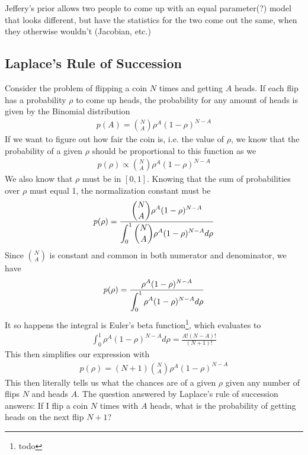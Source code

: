 Jeffery's prior allows two people to come up with an equal parameter(?) model that looks different, but have the statistics for the two come out the same, when they otherwise wouldn't (Jacobian, etc.)

\subsection{Laplace's Rule of Succession}
Consider the problem of flipping a coin $N$ times and getting $A$ heads. If each flip has a probability $\rho$ to come up heads, the probability for any amount of heads is given by the Binomial distribution
\begin{align}
p(A) = {N\choose A}\rho^A(1-\rho)^{N-A}
\end{align}
If we want to figure out how fair the coin is, i.e. the value of $\rho$, we know that the probability of a given $\rho$ should be proportional to this function as we
\begin{align}
	p(\rho) \propto {N\choose A}\rho^A(1-\rho)^{N-A}
\end{align}
We also know that $\rho$ must be in $[0,1]$. Knowing that the sum of probabilities over $\rho$ must equal 1, the normalization constant must be
\begin{align}
	p(\rho) =\frac{\displaystyle  {N\choose A}\rho^A(1-\rho)^{N-A}}{\displaystyle \int_0^1{N\choose A}\rho^A(1-\rho)^{N-A} d\rho}
\end{align}
Since ${N\choose A}$ is constant and common in both numerator and denominator, we have
\begin{align}
	p(\rho) =\frac{\displaystyle  \rho^A(1-\rho)^{N-A}}{\displaystyle \int_0^1\rho^A(1-\rho)^{N-A} d\rho}
\end{align}
It so happens the integral is Euler's beta function\footnote{todo}, which evaluates to 
\begin{align}
	\int_0^1\rho^A(1-\rho)^{N-A} d\rho = \frac{A!(N-A)!}{(N+1)!}
\end{align}
This then simplifies our expression with
\begin{align}
	p(\rho) =(N+1){N\choose A}\rho^A(1-\rho)^{N-A}
\end{align}
This then literally tells us what the chances are of a given $\rho$ given any number of flips $N$ and heads $A$. The question answered by Laplace's rule of succession answers: If I flip a coin $N$ times with $A$ heads, what is the probability of getting heads on the next flip $N+1$?

